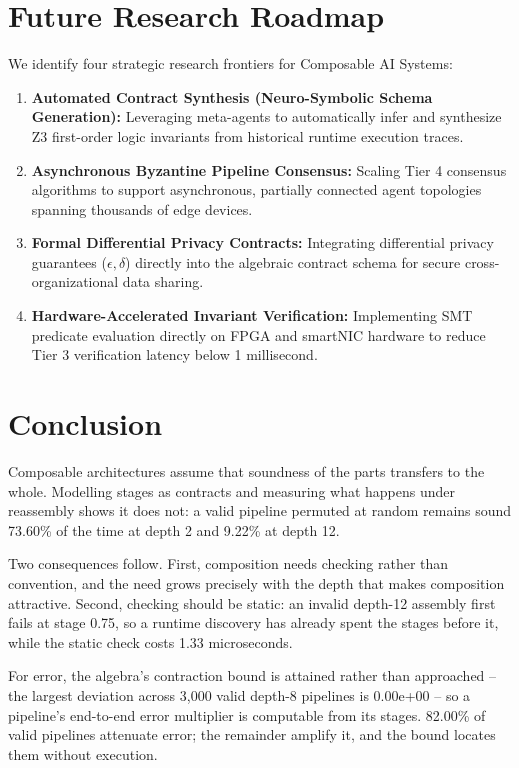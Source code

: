 \documentclass[10pt,journal,compsoc,twocolumn]{IEEEtran}
\begin{document}
\section{Future Research Roadmap}


We identify four strategic research frontiers for Composable AI Systems:
\begin{enumerate}
  \item \textbf{Automated Contract Synthesis (Neuro-Symbolic Schema Generation):} Leveraging meta-agents to automatically infer and synthesize Z3 first-order logic invariants from historical runtime execution traces.
  \item \textbf{Asynchronous Byzantine Pipeline Consensus:} Scaling Tier 4 consensus algorithms to support asynchronous, partially connected agent topologies spanning thousands of edge devices.
  \item \textbf{Formal Differential Privacy Contracts:} Integrating differential privacy guarantees ($\epsilon, \delta$) directly into the algebraic contract schema for secure cross-organizational data sharing.
  \item \textbf{Hardware-Accelerated Invariant Verification:} Implementing SMT predicate evaluation directly on FPGA and smartNIC hardware to reduce Tier 3 verification latency below 1 millisecond.
\end{enumerate}




\section{Conclusion}


Composable architectures assume that soundness of the parts transfers to the whole. Modelling stages as contracts and measuring what happens under reassembly shows it does not: a valid pipeline permuted at random remains sound 73.60\% of the time at depth 2 and 9.22\% at depth 12.

Two consequences follow. First, composition needs checking rather than convention, and the need grows precisely with the depth that makes composition attractive. Second, checking should be static: an invalid depth-12 assembly first fails at stage 0.75, so a runtime discovery has already spent the stages before it, while the static check costs 1.33 microseconds.

For error, the algebra's contraction bound is attained rather than approached -- the largest deviation across 3,000 valid depth-8 pipelines is 0.00e+00 -- so a pipeline's end-to-end error multiplier is computable from its stages. 82.00\% of valid pipelines attenuate error; the remainder amplify it, and the bound locates them without execution.
\end{document}
